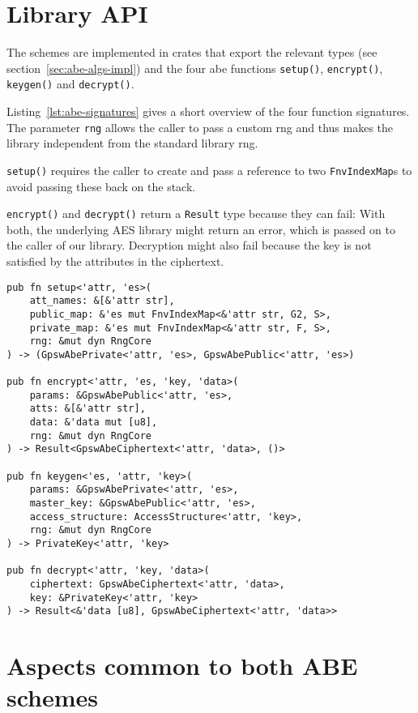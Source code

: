 \section{Library API}
The schemes are implemented in crates that export the relevant types (see section~\ref{sec:abe-algs-impl}) and the four \acrshort{abe} functions \texttt{setup()}, \texttt{encrypt()}, \texttt{keygen()} and \texttt{decrypt()}.

Listing~\ref{lst:abe-signatures} gives a short overview of the four function signatures.
The parameter \texttt{rng} allows the caller to pass a custom \acrlong{rng} and thus makes the library independent from the standard library \acrshort{rng}.

\texttt{setup()} requires the caller to create and pass a reference to two \texttt{FnvIndexMap}s to avoid passing these back on the stack.

\texttt{encrypt()} and \texttt{decrypt()} return a \texttt{Result} type because they can fail: 
With both, the underlying AES library might return an error, which is passed on to the caller of our library.
Decryption might also fail because the key is not satisfied by the attributes in the ciphertext.

\begin{lstlisting}[float=h!,caption={Exported function signatures of the GPSW scheme},label={lst:abe-signatures}]
pub fn setup<'attr, 'es>(
    att_names: &[&'attr str], 
    public_map: &'es mut FnvIndexMap<&'attr str, G2, S>, 
    private_map: &'es mut FnvIndexMap<&'attr str, F, S>, 
    rng: &mut dyn RngCore
) -> (GpswAbePrivate<'attr, 'es>, GpswAbePublic<'attr, 'es>) 

pub fn encrypt<'attr, 'es, 'key, 'data>(
    params: &GpswAbePublic<'attr, 'es>, 
    atts: &[&'attr str], 
    data: &'data mut [u8], 
    rng: &mut dyn RngCore
) -> Result<GpswAbeCiphertext<'attr, 'data>, ()> 

pub fn keygen<'es, 'attr, 'key>(
    params: &GpswAbePrivate<'attr, 'es>, 
    master_key: &GpswAbePublic<'attr, 'es>, 
    access_structure: AccessStructure<'attr, 'key>, 
    rng: &mut dyn RngCore
) -> PrivateKey<'attr, 'key> 

pub fn decrypt<'attr, 'key, 'data>(
    ciphertext: GpswAbeCiphertext<'attr, 'data>, 
    key: &PrivateKey<'attr, 'key>
) -> Result<&'data [u8], GpswAbeCiphertext<'attr, 'data>> 
\end{lstlisting}

\section{Aspects common to both ABE schemes}

